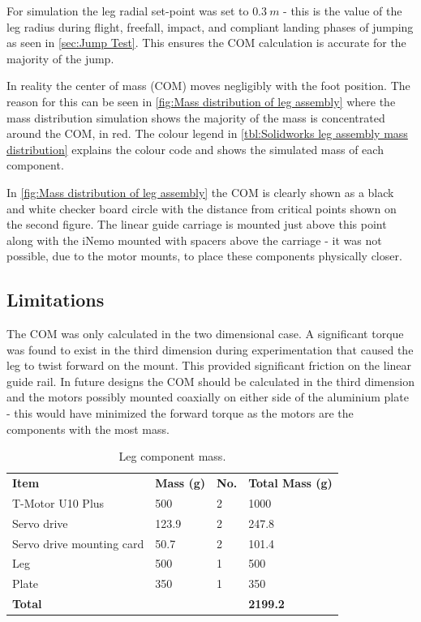 For simulation the leg radial set-point was set to $0.3\ m$ - this is the value of the leg radius during flight, freefall, impact, and compliant landing phases of jumping as seen in \cref{sec:Jump Test}. This ensures the COM calculation is accurate for the majority of the jump. 

In reality the center of mass (COM) moves negligibly with the foot position. The reason for this can be seen in \cref{fig:Mass distribution of leg assembly} where the mass distribution simulation shows the majority of the mass is concentrated around the COM, in red. The colour legend in \cref{tbl:Solidworks leg assembly mass distribution} explains the colour code and shows the simulated mass of each component.

In \cref{fig:Mass distribution of leg assembly} the COM is clearly shown as a black and white checker board circle with the distance from critical points shown on the second figure. The linear guide carriage is mounted just above this point along with the iNemo mounted with spacers above the carriage - it was not possible, due to the motor mounts, to place these components physically closer.

\subsection{Limitations}

The COM was only calculated in the two dimensional case. A significant torque was found to exist in the third dimension during experimentation that caused the leg to twist forward on the mount. This provided significant friction on the linear guide rail. In future designs the COM should be calculated in the third dimension and the motors possibly mounted coaxially on either side of the aluminium plate - this would have minimized the forward torque as the motors are the components with the most mass.

\begin{table}[]
\centering
\begin{tabular}{llll}
\textbf{Item}             & \textbf{Mass (g)} & \textbf{No.} & \textbf{Total Mass (g)} \\
T-Motor U10 Plus          & 500               & 2            & 1000                    \\
Servo drive               & 123.9             & 2            & 247.8                   \\
Servo drive mounting card & 50.7              & 2            & 101.4                   \\
Leg                       & 500               & 1            & 500                     \\
Plate                     & 350               & 1            & 350                     \\
\textbf{Total}            & \textbf{}         & \textbf{}    & \textbf{2199.2}        
\end{tabular}
\caption{Leg component mass.}
\label{tbl:Leg component mass}
\end{table}


